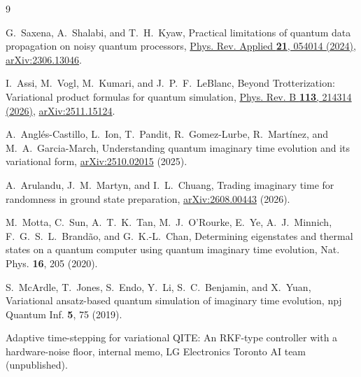 \documentclass[aps,pra,reprint,superscriptaddress,nofootinbib]{revtex4-2}
\begin{document}
\begin{thebibliography}{9}

G.~Saxena, A.~Shalabi, and T.~H.~Kyaw,
Practical limitations of quantum data propagation on noisy quantum processors,
\href{https://doi.org/10.1103/PhysRevApplied.21.054014}{Phys. Rev. Applied \textbf{21}, 054014 (2024)},
\href{https://arxiv.org/abs/2306.13046}{arXiv:2306.13046}.

I.~Assi, M.~Vogl, M.~Kumari, and J.~P.~F.~LeBlanc,
Beyond Trotterization: Variational product formulas for quantum simulation,
\href{https://doi.org/10.1103/941r-ql3g}{Phys. Rev. B \textbf{113}, 214314 (2026)},
\href{https://arxiv.org/abs/2511.15124}{arXiv:2511.15124}.

A.~Anglés-Castillo, L.~Ion, T.~Pandit, R.~Gomez-Lurbe, R.~Martínez, and M.~A.~Garcia-March,
Understanding quantum imaginary time evolution and its variational form,
\href{https://arxiv.org/abs/2510.02015}{arXiv:2510.02015} (2025).

A.~Arulandu, J.~M.~Martyn, and I.~L.~Chuang,
Trading imaginary time for randomness in ground state preparation,
\href{https://arxiv.org/abs/2608.00443}{arXiv:2608.00443} (2026).

M.~Motta, C.~Sun, A.~T.~K.~Tan, M.~J.~O'Rourke, E.~Ye, A.~J.~Minnich, F.~G.~S.~L.~Brandão, and
G.~K.-L.~Chan,
Determining eigenstates and thermal states on a quantum computer using quantum imaginary time
evolution, Nat. Phys. \textbf{16}, 205 (2020).

S.~McArdle, T.~Jones, S.~Endo, Y.~Li, S.~C.~Benjamin, and X.~Yuan,
Variational ansatz-based quantum simulation of imaginary time evolution,
npj Quantum Inf. \textbf{5}, 75 (2019).

Adaptive time-stepping for variational QITE: An RKF-type controller with a hardware-noise floor,
internal memo, LG Electronics Toronto AI team (unpublished).

\end{thebibliography}
\end{document}
